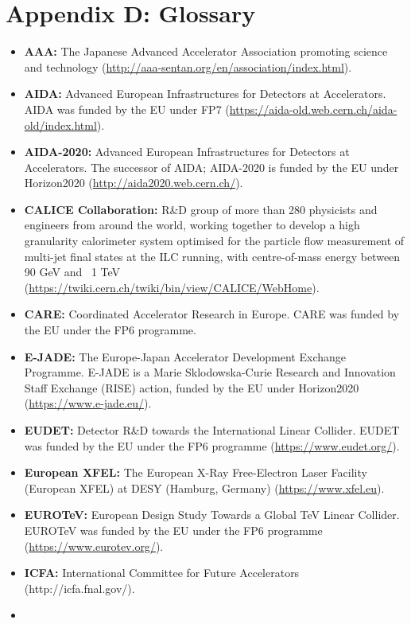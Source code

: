 \documentclass[%
reprint,
 floatfix,
 amsmath,amssymb,
 aps,
]{revtex4-1}
\begin{document}
\section*{\label{Appendix4} \Large{Appendix D: Glossary} }
\begin{itemize}
\item
\textbf{AAA:} The Japanese Advanced Accelerator Association promoting science and technology (\url{http://aaa-sentan.org/en/association/index.html}).
\item
\textbf{AIDA:} Advanced European Infrastructures for Detectors at Accelerators. AIDA was funded by the EU under FP7 (\url{https://aida-old.web.cern.ch/aida-old/index.html}).
\item
\textbf{AIDA-2020:} Advanced European Infrastructures for Detectors at Accelerators. The successor of AIDA; AIDA-2020 is funded by the EU under Horizon2020 (\url{http://aida2020.web.cern.ch/}).
\item
\textbf{CALICE Collaboration:} R\&D group of more than 280 physicists and engineers from around the world, working together to develop a high granularity calorimeter system optimised for the particle flow measurement of multi-jet final states at the ILC running, with centre-of-mass energy between 90 GeV and ~1 TeV (\url{https://twiki.cern.ch/twiki/bin/view/CALICE/WebHome}).
\item
\textbf{CARE:} Coordinated Accelerator Research in Europe. CARE was funded by the EU under the FP6 programme.
\item
\textbf{E-JADE:} The Europe-Japan Accelerator Development Exchange Programme. E-JADE is a Marie Sklodowska-Curie Research and Innovation Staff Exchange (RISE) action, funded by the EU under Horizon2020 (\url{https://www.e-jade.eu/}).
\item
\textbf{EUDET:} Detector R\&D towards the International Linear Collider. EUDET was funded by the EU under the FP6 programme (\url{https://www.eudet.org/}).
\item
\textbf{European XFEL:} The European X-Ray Free-Electron Laser Facility (European XFEL) at DESY (Hamburg, Germany) (\url{https://www.xfel.eu}).
\item
\textbf{EUROTeV:} European Design Study Towards a Global TeV Linear Collider. EUROTeV was funded by the EU under the FP6 programme (\url{https://www.eurotev.org/}).
\item
\textbf{ICFA:} International Committee for Future Accelerators (http://icfa.fnal.gov/).
\item

\end{itemize}
\end{document}
